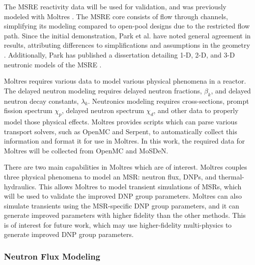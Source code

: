 
The \gls{MSRE} reactivity data will be used for validation, and was previously modeled with Moltres \cite{lindsay_introduction_2018}.
The \gls{MSRE} core consists of flow through channels, simplifying its modeling compared to open-pool designs due to the restricted flow path.
Since the initial demonstration, Park et al. have noted general agreement in results, attributing differences to simplifications and assumptions in the geometry \cite{park2022verification}.
Additionally, Park has published a dissertation detailing 1-D, 2-D, and 3-D neutronic models of the \gls{MSRE} \cite{park_advancements_2025}.

Moltres requires various data to model various physical phenomena in a reactor.
The delayed neutron modeling requires delayed neutron fractions, $\beta_{k}$, and delayed neutron decay constants, $\lambda_k$.
Neutronics modeling requires cross-sections, prompt fission spectrum $\chi_p$, delayed neutron spectrum $\chi_{d}$, and other data to properly model those physical effects.
Moltres provides scripts which can parse various transport solvers, such as OpenMC and Serpent, to automatically collect this information and format it for use in Moltres.
In this work, the required data for Moltres will be collected from OpenMC and \gls{MoSDeN}.

There are two main capabilities in Moltres which are of interest.
Moltres couples three physical phenomena to model an \gls{MSR}: neutron flux, \glspl{DNP}, and thermal-hydraulics.
This allows Moltres to model transient simulations of \glspl{MSR}, which will be used to validate the improved \gls{DNP} group parameters.
Moltres can also simulate transients using the \gls{MSR}-specific \gls{DNP} group parameters, and it can generate improved parameters with higher fidelity than the other methods.
This is of interest for future work, which may use higher-fidelity multi-physics to generate improved \gls{DNP} group parameters.

\subsubsection{Neutron Flux Modeling}

